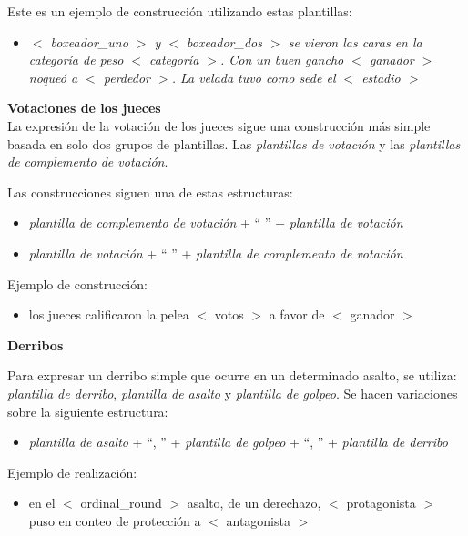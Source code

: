     Este es un ejemplo de construcción utilizando estas plantillas:
    \begin{itemize}
        \item \textit{$<$ boxeador\_uno $>$ y $<$ boxeador\_dos $>$ se vieron las caras en la categoría de peso $<$ categoría $>$. Con un buen 
        gancho $<$ ganador $>$ noqueó a $<$ perdedor $>$. La velada tuvo como sede el $<$ estadio $>$}
    \end{itemize}


    \textbf{Votaciones de los jueces}\\

    La expresión de la votación de los jueces sigue una construcción más simple basada en solo dos grupos de plantillas. 
Las \textit{plantillas de votación} y las \textit{plantillas de complemento de votación}.
    
    Las construcciones siguen una de estas estructuras:
    \begin{itemize}
        \item \textit{plantilla de complemento de votación} + “ ” + \textit{plantilla de votación}
        \item \textit{plantilla de votación} + “ ” + \textit{plantilla de complemento de votación}
    \end{itemize}

    Ejemplo de construcción:
    \begin{itemize}
        \item los jueces calificaron  la pelea $<$ votos $>$ a favor de $<$ ganador $>$
    \end{itemize}



    \textbf{Derribos}

    Para expresar un derribo simple que ocurre en un determinado asalto, se utiliza: \textit{plantilla de derribo}, 
    \textit{plantilla de asalto} y \textit{plantilla de golpeo}. Se hacen variaciones sobre la siguiente estructura:
    \begin{itemize}
        \item \textit{plantilla de asalto} + “, ” + \textit{plantilla de golpeo} + “, ” + \textit{plantilla de derribo}
    \end{itemize}
    Ejemplo de realización:
    \begin{itemize}
        \item en el $<$ ordinal\_round $>$ asalto, de un derechazo, $<$ protagonista $>$ puso en conteo de protección a $<$ antagonista $>$
    \end{itemize}

